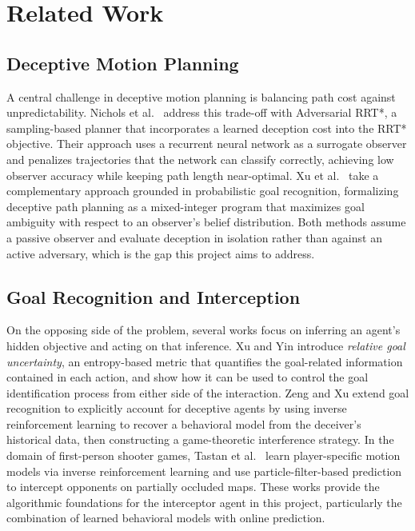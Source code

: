 \documentclass[letterpaper, 10pt, conference]{ieeeconf}
\begin{document}
\section{Related Work} \label{sec:related-work}

\subsection{Deceptive Motion Planning} \label{sec:related-work/deceptive-motion-planning}

A central challenge in deceptive motion planning is balancing path cost against unpredictability. Nichols et al.\ \cite{nichols2022adversarial} address this trade-off with Adversarial RRT*, a sampling-based planner that incorporates a learned deception cost into the RRT* objective. Their approach uses a recurrent neural network as a surrogate observer and penalizes trajectories that the network can classify correctly, achieving low observer accuracy while keeping path length near-optimal. Xu et al.\ \cite{xu2020single} take a complementary approach grounded in probabilistic goal recognition, formalizing deceptive path planning as a mixed-integer program that maximizes goal ambiguity with respect to an observer's belief distribution. Both methods assume a passive observer and evaluate deception in isolation rather than against an active adversary, which is the gap this project aims to address.

\subsection{Goal Recognition and Interception} \label{sec:related-work/goal-recognition-and-interception}

On the opposing side of the problem, several works focus on inferring an agent's hidden objective and acting on that inference. Xu and Yin \cite{xu2019goal} introduce \emph{relative goal uncertainty}, an entropy-based metric that quantifies the goal-related information contained in each action, and show how it can be used to control the goal identification process from either side of the interaction. Zeng and Xu \cite{zeng2023recognition} extend goal recognition to explicitly account for deceptive agents by using inverse reinforcement learning to recover a behavioral model from the deceiver's historical data, then constructing a game-theoretic interference strategy. In the domain of first-person shooter games, Tastan et al.\ \cite{tastan2012learning} learn player-specific motion models via inverse reinforcement learning and use particle-filter-based prediction to intercept opponents on partially occluded maps. These works provide the algorithmic foundations for the interceptor agent in this project, particularly the combination of learned behavioral models with online prediction.
\end{document}
